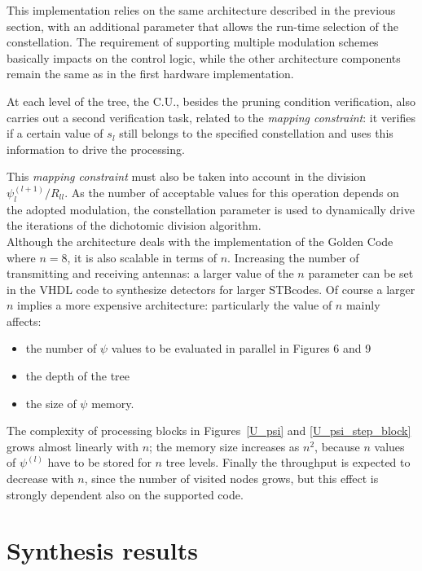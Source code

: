 \documentclass[12pt,onecolumn,draftclsnofoot]{IEEEtran}
\begin{document}
This implementation relies on the same architecture described in the previous 
section, with an additional parameter that allows the run-time selection of 
the constellation.
The requirement of supporting multiple modulation schemes basically impacts on 
the control logic, while the other architecture components remain the same as 
in the first hardware implementation.

At each level of the tree, the C.U., besides the pruning condition
verification, also carries out a second verification task, related to the {\it mapping constraint}:
it verifies if a certain value of $s_l$ still belongs to the specified constellation
and uses this information to drive the processing.

This {\it mapping constraint} must also be taken into account in the
division $\psi_l^{(l+1)} / R_{ll}$. As the number of acceptable values for
this operation depends on the adopted modulation, 
the constellation parameter is used to dynamically drive the
iterations of the dichotomic division algorithm.\\

Although the architecture deals with the implementation of the Golden Code where $n=8$,
it is also scalable in terms of $n$. Increasing the number of transmitting and 
receiving antennas: a larger value of the $n$ parameter
can be set in the VHDL code to synthesize detectors for larger STBcodes. 
Of course a larger $n$ implies a more expensive architecture: particularly
the value of $n$ mainly affects:
\begin{itemize}
\item the number of $\psi$ values to be evaluated in parallel in Figures 6 and 9
\item the depth of the tree 
\item the size of $\psi$ memory.
\end{itemize}
The complexity of processing blocks in Figures~\ref{U_psi} and \ref{U_psi_step_block} 
grows almost linearly 
with $n$; the memory size increases as $n^2$, because $n$ values of $\psi^{(l)}$ have to
be stored for $n$ tree levels. Finally the throughput is expected to decrease
with $n$, since the number of visited nodes grows, but this effect is strongly
dependent also on the supported code.


\section{Synthesis results}
\label{sec:Result}
\end{document}
